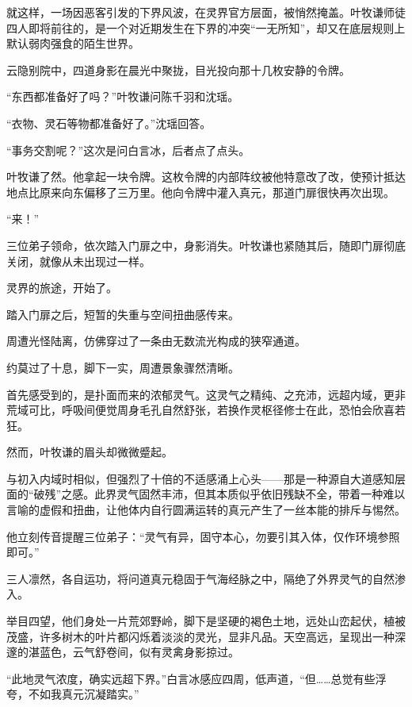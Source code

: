 就这样，一场因恶客引发的下界风波，在灵界官方层面，被悄然掩盖。叶牧谦师徒四人即将前往的，是一个对近期发生在下界的冲突“一无所知”，却又在底层规则上默认弱肉强食的陌生世界。

\vspace{2em}

云隐别院中，四道身影在晨光中聚拢，目光投向那十几枚安静的令牌。

“东西都准备好了吗？”叶牧谦问陈千羽和沈瑶。

“衣物、灵石等物都准备好了。”沈瑶回答。

“事务交割呢？”这次是问白言冰，后者点了点头。

叶牧谦了然。他拿起一块令牌。这枚令牌的内部阵纹被他特意改了改，使预计抵达地点比原来向东偏移了三万里。他向令牌中灌入真元，那道门扉很快再次出现。

“来！”

三位弟子领命，依次踏入门扉之中，身影消失。叶牧谦也紧随其后，随即门扉彻底关闭，就像从未出现过一样。

灵界的旅途，开始了。

\vspace{2em}

踏入门扉之后，短暂的失重与空间扭曲感传来。

周遭光怪陆离，仿佛穿过了一条由无数流光构成的狭窄通道。

约莫过了十息，脚下一实，周遭景象骤然清晰。

\vspace{2em}

首先感受到的，是扑面而来的浓郁灵气。这灵气之精纯、之充沛，远超内域，更非荒域可比，呼吸间便觉周身毛孔自然舒张，若换作灵枢径修士在此，恐怕会欣喜若狂。

然而，叶牧谦的眉头却微微蹙起。

与初入内域时相似，但强烈了十倍的不适感涌上心头——那是一种源自大道感知层面的“破残”之感。此界灵气固然丰沛，但其本质似乎依旧残缺不全，带着一种难以言喻的虚假和扭曲，让他体内自行圆满运转的真元产生了一丝本能的排斥与惕然。

他立刻传音提醒三位弟子：“灵气有异，固守本心，勿要引其入体，仅作环境参照即可。”

三人凛然，各自运功，将问道真元稳固于气海经脉之中，隔绝了外界灵气的自然渗入。

举目四望，他们身处一片荒郊野岭，脚下是坚硬的褐色土地，远处山峦起伏，植被茂盛，许多树木的叶片都闪烁着淡淡的灵光，显非凡品。天空高远，呈现出一种深邃的湛蓝色，云气舒卷间，似有灵禽身影掠过。

“此地灵气浓度，确实远超下界。”白言冰感应四周，低声道，“但……总觉有些浮夸，不如我真元沉凝踏实。”

